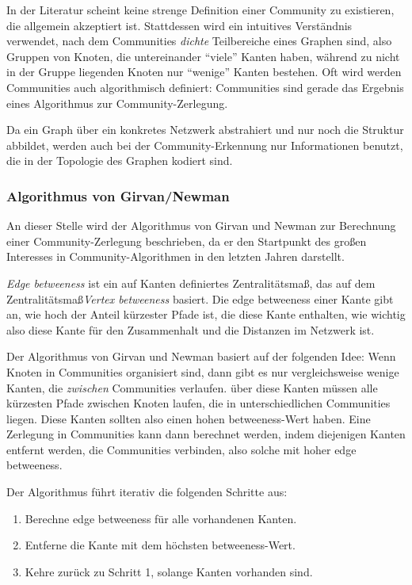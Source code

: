 In der Literatur scheint keine strenge Definition einer Community zu
existieren, die allgemein akzeptiert ist. Stattdessen wird ein
intuitives Verständnis verwendet, nach dem Communities \emph{dichte}
Teilbereiche eines Graphen sind, also Gruppen von Knoten, die
untereinander ``viele'' Kanten haben, während zu nicht in der Gruppe
liegenden Knoten nur ``wenige'' Kanten bestehen. Oft wird werden
Communities auch algorithmisch definiert: Communities sind gerade das
Ergebnis eines Algorithmus zur Community-Zerlegung.

Da ein Graph über ein konkretes Netzwerk abstrahiert und nur noch
die Struktur abbildet, werden auch bei der Community-Erkennung nur
Informationen benutzt, die in der Topologie des Graphen kodiert sind. 

\subsubsection{Algorithmus von Girvan/Newman}
\label{sec:algor-von-girv-1}

An dieser Stelle wird der Algorithmus von Girvan
und Newman\cite{Newman2004} zur Berechnung einer Community-Zerlegung
beschrieben, da er den Startpunkt des großen Interesses in
Community-Algorithmen in den letzten Jahren darstellt.

\emph{Edge betweeness} ist ein auf Kanten definiertes
Zentralitätsma\ss, das auf dem Zentralitätsma\ss \emph{Vertex
  betweeness} \cite{Koschutzki2004a} basiert. Die edge betweeness
einer Kante gibt an, wie hoch der Anteil kürzester Pfade ist, die
diese Kante enthalten, wie wichtig also diese Kante für den
Zusammenhalt und die Distanzen im Netzwerk ist.

Der Algorithmus von Girvan und Newman basiert auf der folgenden Idee:
Wenn Knoten in Communities organisiert sind, dann gibt es nur
vergleichsweise wenige Kanten, die \emph{zwischen} Communities
verlaufen. über diese Kanten müssen alle kürzesten Pfade
zwischen Knoten laufen, die in unterschiedlichen Communities
liegen. Diese Kanten sollten also einen hohen betweeness-Wert
haben. Eine Zerlegung in Communities kann dann berechnet werden, indem
diejenigen Kanten entfernt werden, die Communities verbinden, also
solche mit hoher edge betweeness.

Der Algorithmus führt iterativ die folgenden Schritte aus:

\begin{enumerate}
\item Berechne edge betweeness für alle vorhandenen Kanten.
\item Entferne die Kante mit dem höchsten betweeness-Wert.
\item Kehre zurück zu Schritt 1, solange Kanten vorhanden sind.
\end{enumerate}

